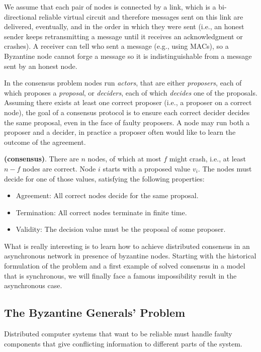 \bigskip
\noindent
We assume that each pair of nodes is connected by a link, which is a bi-directional reliable virtual circuit
and therefore messages sent on this link are delivered, eventually, and in the order in which they were sent
(i.e., an honest sender keeps retransmitting a message until it receives an acknowledgment or crashes). A
receiver can tell who sent a message (e.g., using MACs), so a Byzantine node cannot forge a message so it
is indistinguishable from a message sent by an honest node.

\bigskip
\noindent
In the consensus problem nodes run \textit{actors}, that are either \textit{proposers}, each of which proposes a \textit{proposal}, or \textit{deciders}, each of which \textit{decides} one of the proposals. Assuming there exists at least one correct proposer
(i.e., a proposer on a correct node), the goal of a consensus protocol is to ensure each correct decider decides
the same proposal, even in the face of faulty proposers. A node may run both a proposer and a decider, in
practice a proposer often would like to learn the outcome of the agreement.
\begin{mydef} {\bf (consensus)}.\label{def:consensus}
    There are $n$ nodes, of which at most $f$ might crash, i.e., at least $n-f$ nodes are correct. Node $i$ starts with a proposed value $v_{i}$. The nodes must decide for one of those values, satisfying the following properties:
    \begin{itemize}
        \item Agreement: All correct nodes decide for the same proposal.
        \item Termination: All correct nodes terminate in finite time.
        \item Validity: The decision value must be the proposal of some proposer.
    \end{itemize}
\end{mydef}

\bigskip
\noindent
What is really interesting is to learn how to achieve distributed consensus in an asynchronous network in presence of byzantine nodes. Starting with the historical formulation of the problem and a first example of solved consensus in a model that is synchronous, we will finally face a famous impossibility result in the asynchronous case.

\bigskip
\subsection{The Byzantine Generals' Problem}
Distributed computer systems that want to be reliable must handle faulty components that give conflicting information to different parts of the system.


